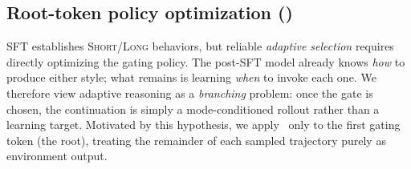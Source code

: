 \subsection{Root-token policy optimization (\Ours)}\label{subsec:rpo}
SFT establishes \textsc{Short}/\textsc{Long} behaviors, but reliable \emph{adaptive selection} requires directly optimizing the gating policy.
The post-SFT model already knows \emph{how} to produce either style; what remains is learning \emph{when} to invoke each one.
We therefore view adaptive reasoning as a \emph{branching} problem: once the gate is chosen, the continuation is simply a mode-conditioned rollout rather than a learning target.
Motivated by this hypothesis, we apply \Ours~only to the first gating token (the root), treating the remainder of each sampled trajectory purely as environment output.

